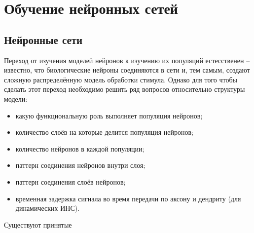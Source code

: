 \documentclass[a4paper,10pt]{article}
\begin{document}
\section{Обучение нейронных сетей}
\subsection{Нейронные сети}
\indent Переход от изучения моделей нейронов к изучению их популяций естесственен -- известно, что биологические нейроны соединяются в сети и, тем самым, создают сложную распределённую модель обработки стимула. Однако для того чтобы сделать этот переход необходимо решить ряд вопросов относительно структуры модели:
\begin{itemize}
\item какую функциональную роль выполняет популяция нейронов;
\item количество слоёв на которые делится популяция нейронов;
\item количество нейронов в каждой популяции;
\item паттерн соединения нейронов внутри слоя;
\item паттерн соединения слоёв нейронов;
\item временная задержка сигнала во время передачи по аксону и дендриту (для динамических ИНС).
\end{itemize}
\indent Существуют принятые 
\end{document}
